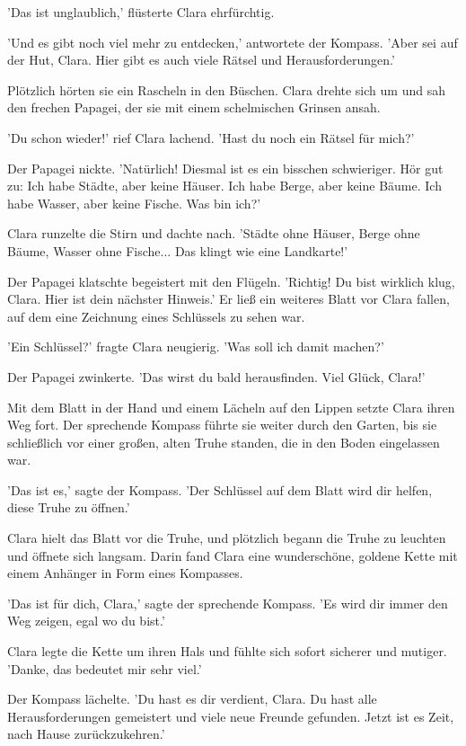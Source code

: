\documentclass[12pt]{article}
\begin{document}
'Das ist unglaublich,' flüsterte Clara ehrfürchtig.

'Und es gibt noch viel mehr zu entdecken,' antwortete der Kompass. 'Aber sei auf der Hut, Clara. Hier gibt es auch viele Rätsel und Herausforderungen.'

Plötzlich hörten sie ein Rascheln in den Büschen. Clara drehte sich um und sah den frechen Papagei, der sie mit einem schelmischen Grinsen ansah.

'Du schon wieder!' rief Clara lachend. 'Hast du noch ein Rätsel für mich?'

Der Papagei nickte. 'Natürlich! Diesmal ist es ein bisschen schwieriger. Hör gut zu: Ich habe Städte, aber keine Häuser. Ich habe Berge, aber keine Bäume. Ich habe Wasser, aber keine Fische. Was bin ich?'

Clara runzelte die Stirn und dachte nach. 'Städte ohne Häuser, Berge ohne Bäume, Wasser ohne Fische... Das klingt wie eine Landkarte!'

Der Papagei klatschte begeistert mit den Flügeln. 'Richtig! Du bist wirklich klug, Clara. Hier ist dein nächster Hinweis.' Er ließ ein weiteres Blatt vor Clara fallen, auf dem eine Zeichnung eines Schlüssels zu sehen war.

'Ein Schlüssel?' fragte Clara neugierig. 'Was soll ich damit machen?'

Der Papagei zwinkerte. 'Das wirst du bald herausfinden. Viel Glück, Clara!'

Mit dem Blatt in der Hand und einem Lächeln auf den Lippen setzte Clara ihren Weg fort. Der sprechende Kompass führte sie weiter durch den Garten, bis sie schließlich vor einer großen, alten Truhe standen, die in den Boden eingelassen war.

'Das ist es,' sagte der Kompass. 'Der Schlüssel auf dem Blatt wird dir helfen, diese Truhe zu öffnen.'

Clara hielt das Blatt vor die Truhe, und plötzlich begann die Truhe zu leuchten und öffnete sich langsam. Darin fand Clara eine wunderschöne, goldene Kette mit einem Anhänger in Form eines Kompasses.

'Das ist für dich, Clara,' sagte der sprechende Kompass. 'Es wird dir immer den Weg zeigen, egal wo du bist.'

Clara legte die Kette um ihren Hals und fühlte sich sofort sicherer und mutiger. 'Danke, das bedeutet mir sehr viel.'

Der Kompass lächelte. 'Du hast es dir verdient, Clara. Du hast alle Herausforderungen gemeistert und viele neue Freunde gefunden. Jetzt ist es Zeit, nach Hause zurückzukehren.'
\end{document}
